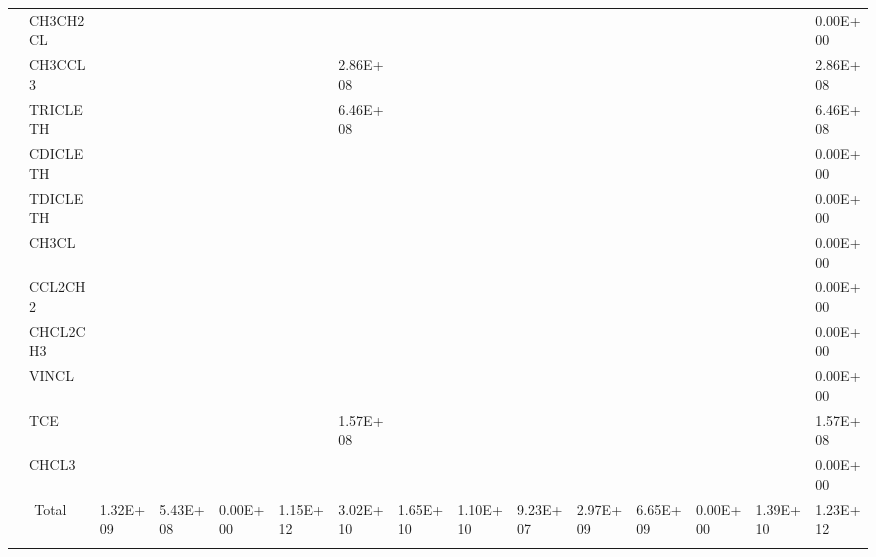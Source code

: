 \begin{longtable}{lllllllllllllll}
	 & CH3CH2CL &  &  &  &  &  &  &  &  &  &  &  &  & 0.00E+00 \\
	 & CH3CCL3 &  &  &  &  & 2.86E+08 &  &  &  &  &  &  &  & 2.86E+08 \\
	 & TRICLETH &  &  &  &  & 6.46E+08 &  &  &  &  &  &  &  & 6.46E+08 \\
	 & CDICLETH &  &  &  &  &  &  &  &  &  &  &  &  & 0.00E+00 \\
	 & TDICLETH &  &  &  &  &  &  &  &  &  &  &  &  & 0.00E+00 \\
	 & CH3CL &  &  &  &  &  &  &  &  &  &  &  &  & 0.00E+00 \\
	 & CCL2CH2 &  &  &  &  &  &  &  &  &  &  &  &  & 0.00E+00 \\
	 & CHCL2CH3 &  &  &  &  &  &  &  &  &  &  &  &  & 0.00E+00 \\
	 & VINCL &  &  &  &  &  &  &  &  &  &  &  &  & 0.00E+00 \\
	 & TCE &  &  &  &  & 1.57E+08 &  &  &  &  &  &  &  & 1.57E+08 \\
	 & CHCL3 &  &  &  &  &  &  &  &  &  &  &  &  & 0.00E+00 \\
	\hline \multicolumn{2}{c}{Total}  & 1.32E+09 & 5.43E+08 & 0.00E+00 & 1.15E+12 & 3.02E+10 & 1.65E+10 & 1.10E+10 & 9.23E+07 & 2.97E+09 & 6.65E+09 & 0.00E+00 & 1.39E+10 & 1.23E+12 \\
	\hline \hline
	\label{t:Luxembourg_MCM_emissions}
\end{longtable}